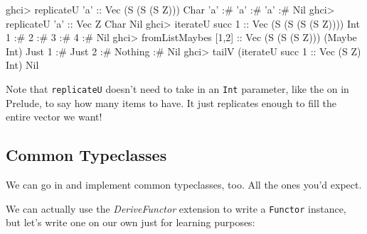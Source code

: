 \documentclass[]{article}
\newenvironment{Shaded}{}{}
\newcommand{\DataTypeTok}[1]{\textcolor[rgb]{0.56,0.13,0.00}{{#1}}}
\newcommand{\DecValTok}[1]{\textcolor[rgb]{0.25,0.63,0.44}{{#1}}}
\newcommand{\CharTok}[1]{\textcolor[rgb]{0.25,0.44,0.63}{{#1}}}
\newcommand{\OtherTok}[1]{\textcolor[rgb]{0.00,0.44,0.13}{{#1}}}
\newcommand{\FunctionTok}[1]{\textcolor[rgb]{0.02,0.16,0.49}{{#1}}}
\newcommand{\NormalTok}[1]{{#1}}
\begin{document}
\begin{Shaded}
\begin{Highlighting}[]
\NormalTok{ghci}\FunctionTok{>} \NormalTok{replicateU }\CharTok{'a'}\OtherTok{       ::} \DataTypeTok{Vec} \NormalTok{(}\DataTypeTok{S} \NormalTok{(}\DataTypeTok{S} \NormalTok{(}\DataTypeTok{S} \DataTypeTok{Z}\NormalTok{))) }\DataTypeTok{Char}
\CharTok{'a'} \FunctionTok{:#} \CharTok{'a'} \FunctionTok{:#} \CharTok{'a'} \FunctionTok{:#} \DataTypeTok{Nil}
\NormalTok{ghci}\FunctionTok{>} \NormalTok{replicateU }\CharTok{'a'}\OtherTok{       ::} \DataTypeTok{Vec} \DataTypeTok{Z} \DataTypeTok{Char}
\DataTypeTok{Nil}
\NormalTok{ghci}\FunctionTok{>} \NormalTok{iterateU succ }\DecValTok{1}\OtherTok{      ::} \DataTypeTok{Vec} \NormalTok{(}\DataTypeTok{S} \NormalTok{(}\DataTypeTok{S} \NormalTok{(}\DataTypeTok{S} \NormalTok{(}\DataTypeTok{S} \DataTypeTok{Z}\NormalTok{)))) }\DataTypeTok{Int}
\DecValTok{1} \FunctionTok{:#} \DecValTok{2} \FunctionTok{:#} \DecValTok{3} \FunctionTok{:#} \DecValTok{4} \FunctionTok{:#} \DataTypeTok{Nil}
\NormalTok{ghci}\FunctionTok{>} \NormalTok{fromListMaybes [}\DecValTok{1}\NormalTok{,}\DecValTok{2}\NormalTok{]}\OtherTok{ ::} \DataTypeTok{Vec} \NormalTok{(}\DataTypeTok{S} \NormalTok{(}\DataTypeTok{S} \NormalTok{(}\DataTypeTok{S} \DataTypeTok{Z}\NormalTok{))) (}\DataTypeTok{Maybe} \DataTypeTok{Int}\NormalTok{)}
\DataTypeTok{Just} \DecValTok{1} \FunctionTok{:#} \DataTypeTok{Just} \DecValTok{2} \FunctionTok{:#} \DataTypeTok{Nothing} \FunctionTok{:#} \DataTypeTok{Nil}
\NormalTok{ghci}\FunctionTok{>} \NormalTok{tailV (iterateU succ }\DecValTok{1}\OtherTok{ ::} \DataTypeTok{Vec} \NormalTok{(}\DataTypeTok{S} \DataTypeTok{Z}\NormalTok{) }\DataTypeTok{Int}\NormalTok{)}
\DataTypeTok{Nil}
\end{Highlighting}
\end{Shaded}

Note that \texttt{replicateU} doesn't need to take in an \texttt{Int} parameter,
like the on in Prelude, to say how many items to have. It just replicates enough
to fill the entire vector we want!

\subsection{Common Typeclasses}\label{common-typeclasses}

We can go in and implement common typeclasses, too. All the ones you'd expect.

We can actually use the \emph{DeriveFunctor} extension to write a
\texttt{Functor} instance, but let's write one on our own just for learning
purposes:
\end{document}
